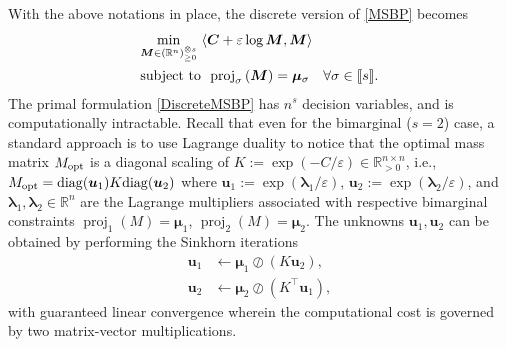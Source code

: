 \documentclass[letterpaper, 10pt, twocolumn]{ieeeconf}      %
\DeclareMathOperator*{\proj}{proj}
\newcommand{\diag}{\mathrm{diag}}
\begin{document}
 
With the above notations in place, the discrete version of \eqref{MSBP} becomes
\begin{subequations}
\begin{align}
&\underset{\bm{M}\in\left(\mathbb{R}^{n}\right)^{\otimes s}_{\geq 0}}{\min}~\langle\bm{C}+\varepsilon\log\bm{M},\bm{M}\rangle\label{DiscreteMSBPobj}\\
&\text{subject to}~~{\rm{proj}}_{\sigma}\left(\bm{M}\right) = \bm{\mu}_{\sigma}\quad\forall\sigma\in\llbracket s\rrbracket.\label{DiscereteMSBPconstr}
\end{align}
\label{DiscreteMSBP}
\end{subequations}
The primal formulation \eqref{DiscreteMSBP} has $n^{s}$ decision variables, and is computationally intractable. Recall that even for the bimarginal ($s=2$) case, a standard approach \cite{cuturi2013sinkhorn} is to use Lagrange duality to notice that the optimal mass matrix $M_{\rm{opt}}$ is a diagonal scaling of $K:=\exp(-C/\varepsilon)\in\mathbb{R}^{n\times n}_{> 0}$, i.e., $M_{\rm{opt}}=\diag(\bm{u}_1) K\diag(\bm{u}_2)$ where $\bm{u}_1 := \exp(\bm{\lambda}_1/\varepsilon)$, $\bm{u}_2 := \exp(\bm{\lambda}_2/\varepsilon)$, and $\bm{\lambda}_1,\bm{\lambda}_2\in\mathbb{R}^{n}$ are the Lagrange multipliers associated with respective bimarginal constraints $\proj_{1}(M)=\bm{\mu}_1$, $\proj_{2}(M)=\bm{\mu}_2$. The unknowns $\bm{u}_1,\bm{u}_2$ can be obtained by performing the Sinkhorn iterations
\begin{subequations}
\begin{align}
\bm{u}_1 &\leftarrow \bm{\mu}_1\oslash \left(K\bm{u}_2\right),\\
\bm{u}_2 &\leftarrow \bm{\mu}_2\oslash \left(K^{\top}\bm{u}_1\right),
\end{align}
\label{BimarginalSink}
\end{subequations}
with guaranteed linear convergence \cite{franklin1989scaling} wherein the computational cost is governed by two matrix-vector multiplications.
\end{document}
